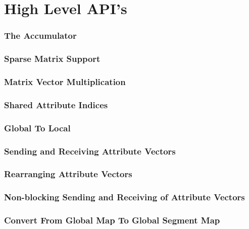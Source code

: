 \documentclass{article}
\begin{document}
\part{High Level API's}
\section{The Accumulator}



\section{Sparse Matrix Support}




%
\section{Matrix Vector Multiplication}

%
\section{Shared Attribute Indices}

%
\section{Global To Local}

%
\section{Sending and Receiving Attribute Vectors}


%
\section{Rearranging Attribute Vectors}

%
\section{Non-blocking Sending and Receiving of Attribute Vectors}

%
\section{Convert From Global Map To Global Segment Map}



 
%
\end{document}
